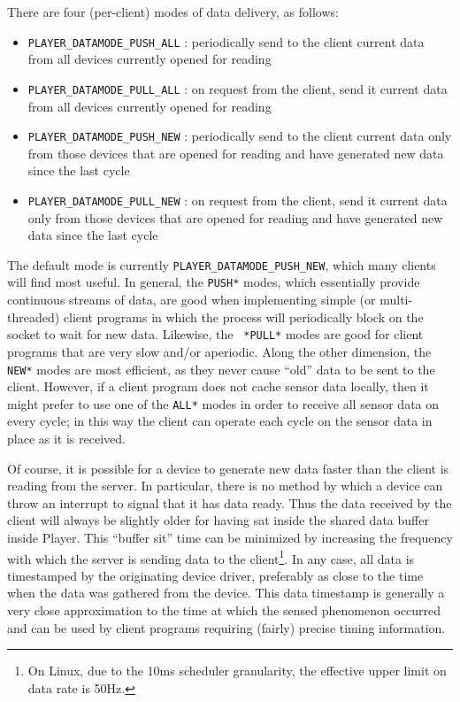 \documentclass[11pt]{report}
\begin{document}
There are four (per-client) modes of data delivery, as follows:
\begin{itemize}
\item {\tt PLAYER\_DATAMODE\_PUSH\_ALL} : periodically send to the client
current data from all devices currently opened for reading
\item {\tt PLAYER\_DATAMODE\_PULL\_ALL} : on request from the client, send it
current data from all devices currently opened for reading
\item {\tt PLAYER\_DATAMODE\_PUSH\_NEW} : periodically send to the client
current data only from those devices that are opened for reading and
have generated new data since the last cycle
\item {\tt PLAYER\_DATAMODE\_PULL\_NEW} : on request from the client, send it 
current data only from those devices that are opened for reading and
have generated new data since the last cycle
\end{itemize}
The default mode is currently {\tt PLAYER\_DATAMODE\_PUSH\_NEW}, which many
clients will find most useful. In general, the {\tt *PUSH*} modes, which
essentially provide continuous streams of data, are good when implementing
simple (or multi-threaded) client programs in which the process will
periodically block on the socket to wait for new data.  Likewise, the {\tt
*PULL*} modes are good for client programs that are very slow and/or aperiodic.
Along the other dimension, the {\tt *NEW*} modes are most efficient, as they
never cause ``old'' data to be sent to the client.  However, if a client
program does not cache sensor data locally, then it might prefer to use one
of the {\tt *ALL*} modes in order to receive all sensor data on every cycle;
in this way the client can operate each cycle on the sensor data in place
as it is received.

Of course, it is possible for a device to generate new data faster than
the client is reading from the server.  In particular, there is no method
by which a device can throw an interrupt to signal that it has data ready.
Thus the data received by the client will always be slightly older for having
sat inside the shared data buffer inside Player.  This ``buffer sit'' time
can be minimized by increasing the frequency with which the server is sending
data to the client\footnote{On Linux, due to the 10ms scheduler granularity,
the effective upper limit on data rate is 50Hz.}.  In any case, all data
is timestamped by the originating device driver, preferably as close to
the time when the data was gathered from the device.  This data timestamp
is generally a very close approximation to the time at which the sensed
phenomenon occurred and can be used by client programs requiring (fairly)
precise timing information.
\end{document}
